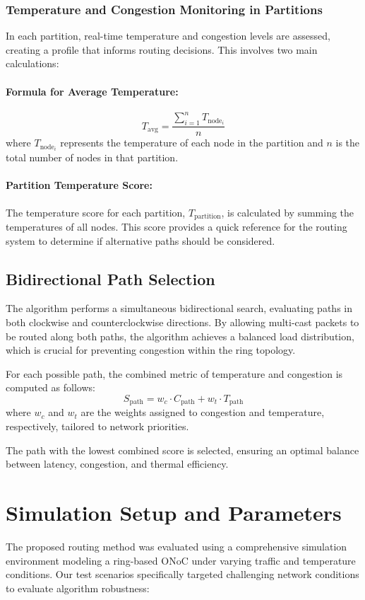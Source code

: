 \documentclass[conference]{IEEEtran}
\begin{document}
\subsubsection{Temperature and Congestion Monitoring in Partitions}
In each partition, real-time temperature and congestion levels are assessed, creating a profile that informs routing decisions. This involves two main calculations:

\paragraph{Formula for Average Temperature:}
\[
T_{\text{avg}} = \frac{\sum_{i=1}^{n} T_{\text{node}_i}}{n}
\]
where $T_{\text{node}_i}$ represents the temperature of each node in the partition and $n$ is the total number of nodes in that partition.

\paragraph{Partition Temperature Score:}
The temperature score for each partition, $T_{\text{partition}}$, is calculated by summing the temperatures of all nodes. This score provides a quick reference for the routing system to determine if alternative paths should be considered.

\subsection{Bidirectional Path Selection}
The algorithm performs a simultaneous bidirectional search, evaluating paths in both clockwise and counterclockwise directions. By allowing multi-cast packets to be routed along both paths, the algorithm achieves a balanced load distribution, which is crucial for preventing congestion within the ring topology.

For each possible path, the combined metric of temperature and congestion is computed as follows:
\[
S_{\text{path}} = w_c \cdot C_{\text{path}} + w_t \cdot T_{\text{path}}
\]
where $w_c$ and $w_t$ are the weights assigned to congestion and temperature, respectively, tailored to network priorities.

The path with the lowest combined score is selected, ensuring an optimal balance between latency, congestion, and thermal efficiency.

\section{Simulation Setup and Parameters}
The proposed routing method was evaluated using a comprehensive simulation environment modeling a ring-based ONoC under varying traffic and temperature conditions. Our test scenarios specifically targeted challenging network conditions to evaluate algorithm robustness:
\end{document}
